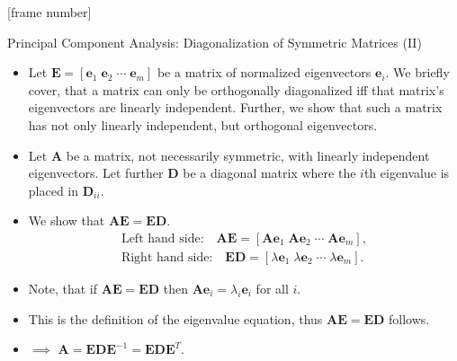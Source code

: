 \documentclass[aspectratio=169,t]{beamer}
\begin{document}
  {
    [frame number]
    \begin{frame}{Principal Component Analysis: Diagonalization of Symmetric Matrices (II)}
    \begin{itemize}
      \item Let $\mathbf{E} = [\mathbf{e}_1 \; \mathbf{e}_2 \; \cdots \; \mathbf{e}_m]$ be a matrix of normalized eigenvectors $\mathbf{e}_i$. We briefly cover, that a matrix can only be orthogonally diagonalized iff that matrix's eigenvectors are linearly independent. Further, we show that such a matrix has not only linearly independent, but orthogonal eigenvectors.
      \item Let $\mathbf{A}$ be a matrix, not necessarily symmetric, with linearly independent eigenvectors. Let further $\mathbf{D}$ be a diagonal matrix where the $i$th eigenvalue is placed in $\mathbf{D}_{ii}$.
      \item We show that $\mathbf{AE} = \mathbf{ED}$.
      \begin{align}
        \text{Left hand side:} \quad \mathbf{AE} = [\mathbf{Ae}_1 \; \mathbf{Ae}_2 \; \cdots \; \mathbf{Ae}_m], \\
        \text{Right hand side:} \quad \mathbf{ED} = [\lambda\mathbf{e}_1 \; \lambda\mathbf{e}_2 \; \cdots \; \lambda\mathbf{e}_m].
      \end{align}
      \item Note, that if $\mathbf{AE} = \mathbf{ED}$ then $\mathbf{Ae}_i = \lambda_i\mathbf{e}_i$ for all $i$. \\
      \item This is the definition of the eigenvalue equation, thus $\mathbf{AE} = \mathbf{ED}$ follows.
      \item $\implies$ $\mathbf{A} = \mathbf{EDE}^{-1} = \mathbf{EDE}^{T}$.
    \end{itemize}
    \end{frame}
  }
\end{document}
